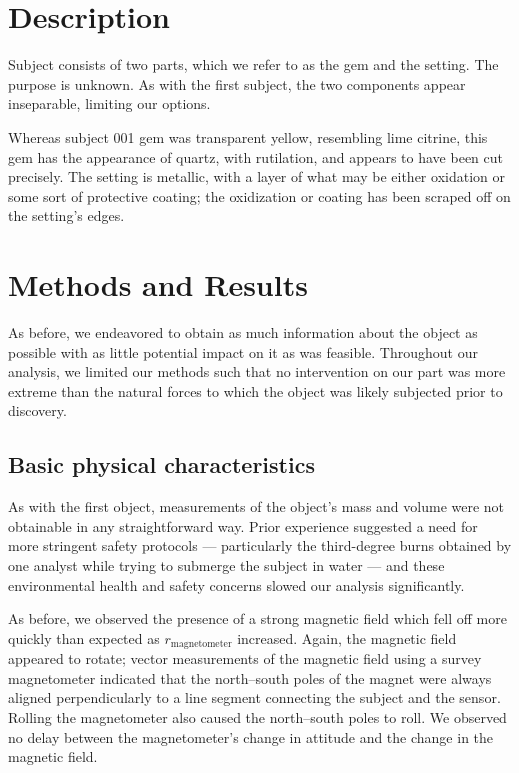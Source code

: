 \documentclass[10pt]{article}
\begin{document}
\maketitle


\section{Description}

Subject consists of two parts, which we refer to as the gem and the setting. The purpose is unknown. As with the first subject, the two components appear inseparable, limiting our options.

Whereas subject 001 gem was transparent yellow, resembling lime citrine, this gem has the appearance of quartz, with rutilation, and appears to have been cut precisely.
The setting is metallic, with a layer of what may be either oxidation or some sort of protective coating; the oxidization or coating has been scraped off on the setting's edges.

\section{Methods and Results}
As before, we endeavored to obtain as much information about the object as possible with as little potential impact on it as was feasible.
Throughout our analysis, we limited our methods such that no intervention on our part was more extreme than the natural forces to which the object was likely subjected prior to discovery.

\subsection{Basic physical characteristics}

As with the first object, measurements of the object's mass and volume were not obtainable in any straightforward way.
Prior experience suggested a need for more stringent safety protocols --- particularly the third-degree burns obtained by one analyst while trying to submerge the subject in water --- and these environmental health and safety concerns slowed our analysis significantly.

As before, we observed the presence of a strong magnetic field which fell off more quickly than expected as $r_\textrm{magnetometer}$ increased.
Again, the magnetic field appeared to rotate; vector measurements of the magnetic field using a survey magnetometer indicated that the north--south poles of the magnet were always aligned perpendicularly to a line segment connecting the subject and the sensor.
Rolling the magnetometer also caused the north--south poles to roll.
We observed no delay between the magnetometer's change in attitude and the change in the magnetic field.
\end{document}
